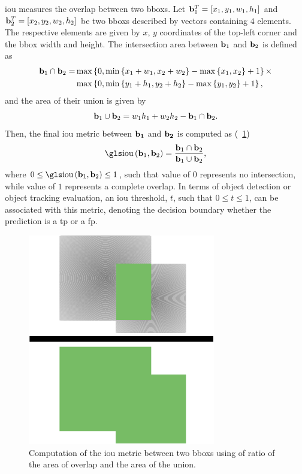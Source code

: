 \gls{iou} measures the overlap between two \glspl{bbox}. Let ${\mathbf{b}}_{1}^{T} = \left[ {x_1, y_1, w_1, h_1} \right]$ and ${\mathbf{b}}_{2}^{T} = \left[ {x_2, y_2, w_2, h_2} \right]$ be two \glspl{bbox} described by vectors containing $4$ elements. The respective elements are given by $x$, $y$ coordinates of the top-left corner and the \gls{bbox} width and height. The intersection area between $\mathbf{b}_1$ and $\mathbf{b}_2$ is defined as
\begin{equation}
    \begin{aligned}
        \mathbf{b}_1 \cap \mathbf{b}_2 =
         & \max \left\{ {0,
            \min \left\{ {x_1 + w_1, x_2 + w_2} \right\} - \max \left\{ {x_1, x_2} \right\} + 1} \right\}
        \times                \\
         & \max \left\{ {0,
            \min \left\{ {y_1 + h_1, y_2 + h_2} \right\} - \max \left\{ {y_1, y_2} \right\} + 1} \right\},
    \end{aligned}
\end{equation}
and the area of their union is given by
\begin{equation}
    \mathbf{b}_1 \cup \mathbf{b}_2 = w_1 h_1 + w_2 h_2 - \mathbf{b}_1 \cap \mathbf{b}_2.
\end{equation}
Then, the final \gls{iou} metric between $\mathbf{b_1}$ and $\mathbf{b_2}$ is computed as (\figtext{}~\ref{fig:IntersectionOverUnion})
\begin{equation}
    \label{eq:IntersectionOverUnion}
    \func{\IOU}{\vect{b}_1, \vect{b}_2} =
    \frac{\vect{b}_1 \cap \vect{b}_2}{\vect{b}_1 \cup \vect{b}_2},
\end{equation}
where $0 \leq \func{\IOU}{\vect{b}_1, \vect{b}_2} \leq 1$, such that value of $0$ represents no intersection, while value of $1$ represents a complete overlap. In terms of object detection or object tracking evaluation, an \gls{iou} threshold, $t$, such that $0 \leq t \leq 1$, can be associated with this metric, denoting the decision boundary whether the prediction is a \gls{tp} or a \gls{fp}.

\begin{figure}[t]
    \centerline{\includegraphics[width=0.2\linewidth]{figures/theoretical_foundations/intersection_over_union.pdf}}
    \caption[\gls{iou} visualization]{Computation of the \gls{iou} metric between two \glspl{bbox} using of ratio of the area of overlap and the area of the union.}
    \label{fig:IntersectionOverUnion}
\end{figure}

